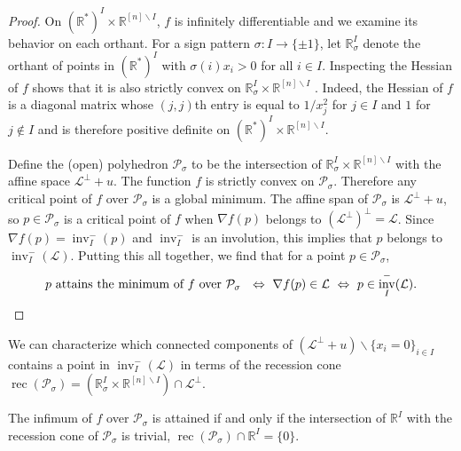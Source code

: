 \documentclass[ALCO,ThmDefs,Unicode,epreuves]{cedram}
\newcommand{\R}{\mathbb{R}}
\newcommand{\cL}{\mathcal{L}}
\newcommand{\cP}{\mathcal{P}}
\DeclareMathOperator{\inv}{inv}
\DeclareMathOperator{\rec}{rec}
\begin{document}
\begin{proof}
On $(\R^*)^I\times \R^{[n]\backslash I}$, $f$ is infinitely differentiable and 
we examine its behavior on each orthant. 
For a sign pattern $\sigma: I \rightarrow \{\pm 1\}$, let $\R^I_\sigma$ denote the orthant 
of points in $(\R^*)^I$ with $\sigma(i)x_i>0$ for all $i\in I$. 
 Inspecting the Hessian of $f$ shows that it is also strictly convex on $\R_\sigma^I\times \R^{[n]\backslash I}$ . 
 Indeed, the Hessian of $f$ is a diagonal matrix 
whose $(j,j)$th entry is equal to $1/x_j^2$ for $j\in I$ and $1$ for $j\not\in I$ and is therefore positive 
definite on $(\R^*)^I \times \R^{[n]\backslash I}$. 

Define the (open) polyhedron $\cP_\sigma$ to be the intersection of $\R^I_\sigma\times \R^{[n]\backslash I}$ with 
the affine space $\cL^{\perp}+u$. 
The function $f$ is strictly convex on $\cP_\sigma$. Therefore any critical point of $f$ over $\cP_\sigma$ is a global minimum. 
The affine span of $ \cP_\sigma$ is $\cL^{\perp}+u$, so $p \in \cP_\sigma$ is a critical point of $f$ 
when $\nabla f (p)$ belongs to $(\cL^{\perp})^{\perp} = \cL$. Since $\nabla f(p) = \inv_I^-(p)$ and $\inv_I^-$ is an involution, 
this implies that $p$ belongs to $\inv_I^-(\cL)$. 
Putting this all together, we find that for a point $p\in \cP_{\sigma}$, 
\[
p \text{ attains the minimum of $f$ over $\cP_{\sigma}$ } 
\ \Leftrightarrow \
\nabla f(p) \in \cL 
\ \Leftrightarrow \
p \in \inv_I^-(\cL).\qedhere 
\]
\end{proof}

We can characterize which connected components of $(\cL^{\perp}+u)\backslash\{x_i=0\}_{i\in I}$ 
contains a point in $\inv_I^-(\cL)$ in terms of the recession cone $\rec(\cP_{\sigma}) = (\R^I_\sigma\times \R^{[n]\backslash I}) \cap \cL^{\perp}$.


\begin{lemm} \label{lem:infF}
The infimum of $f$ over $\cP_\sigma$ is attained if and only if the intersection of $\R^I$ with the recession cone of $\cP_\sigma$ is trivial, \ie 
$\rec(\cP_\sigma) \cap \R^I = \{0\}$. 
\end{lemm}
\end{document}
